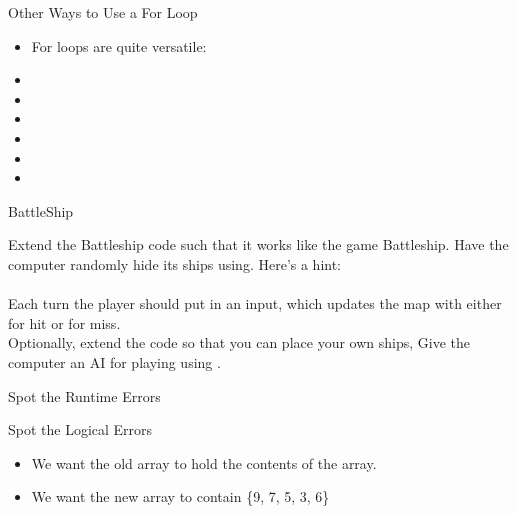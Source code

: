 \begin{frame}{Other Ways to Use a For Loop}
\begin{itemize}
\item For loops are quite versatile:
\item \texttt{} \pause
\item \texttt{} \pause
\item \texttt{} \pause
\item \texttt{} \pause
\item \texttt{} \pause
\item \texttt{}\pause
\end{itemize}
\end{frame}

\begin{frame}{BattleShip}
\begin{center}
Extend the Battleship code such that it works like the game Battleship. Have the computer randomly hide its ships using. Here's a hint:\\

\texttt{}\\

Each turn the player should put in an input, which updates the map with either \texttt{} for hit or \texttt{} for miss. \\ \pause
Optionally, extend the code so that you can place your own ships, Give the computer an AI for playing using \texttt{}.
\end{center}
\end{frame}


\begin{frame}[fragile]{Spot the Runtime Errors}
\begin{semiverbatim}\end{semiverbatim}
\end{frame}


\begin{frame}[fragile]{Spot the Logical Errors}
\begin{itemize}
\item We want the old array to hold the contents of the array.
\item We want the new array to contain \{9, 7, 5, 3, 6\}
\end{itemize}
\begin{semiverbatim}\end{semiverbatim}
\end{frame}

